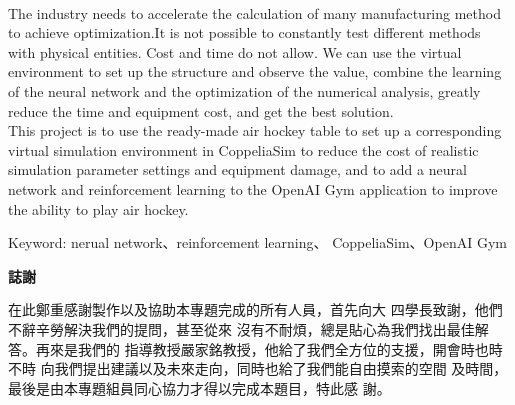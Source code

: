 \documentclass[14pt,a4paper]{report}  %
\begin{document}
\begin{center}
\LARGE\textbf{}\\
\begin{flushleft}
\fontsize{14pt}{14.5pt}\selectfont\hspace{12pt} \sectionef The industry needs to accelerate the calculation of many manufacturing method to achieve optimization.It is not possible to constantly test different methods with physical entities. Cost and time do not allow. We can use the virtual environment to set up the structure and observe the value, combine the learning of the neural network and the optimization of the numerical analysis, greatly reduce the time and equipment cost, and get the best solution.\\

\hspace{12pt} This project is to use the ready-made air hockey table to set up a corresponding virtual simulation environment in CoppeliaSim to reduce the cost of realistic simulation parameter settings and equipment damage, and to add a neural network and reinforcement learning to the OpenAI Gym application to improve the ability to play air hockey.
\end{flushleft}
\begin{center}
\fontsize{14pt}{14.5pt}\selectfont\sectionef Keyword:  nerual network、reinforcement learning、 CoppeliaSim、OpenAI Gym
\end{center}
\newpage
\centerline\LARGE\textbf{誌謝}\\
\begin{flushleft}
\fontsize{14pt}{2.5pt}\hspace{12pt}在此鄭重感謝製作以及協助本專題完成的所有人員，首先向大
四學長致謝，他們不辭辛勞解決我們的提問，甚至從來
沒有不耐煩，總是貼心為我們找出最佳解答。再來是我們的
指導教授嚴家銘教授，他給了我們全方位的支援，開會時也時不時
向我們提出建議以及未來走向，同時也給了我們能自由摸索的空間
及時間，最後是由本專題組員同心協力才得以完成本題目，特此感
謝。
\end{flushleft}
\newpage
\renewcommand{\contentsname}{\centerline{\fontsize{18pt}{\baselineskip}\selectfont\textbf{目\quad 錄}}}
\tableofcontents　　%
\newpage
\renewcommand{\listfigurename}{\centerline{\fontsize{18pt}{\baselineskip}\selectfont\textbf{圖\quad 表\quad 目\quad 錄 }}}
\listoffigures
\newpage
\end{center}
\end{document}
